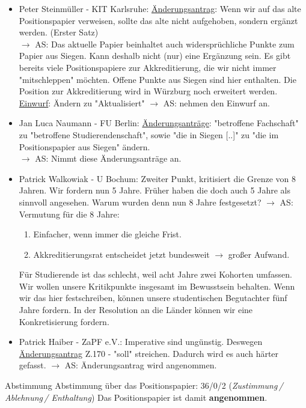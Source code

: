 \begin{itemize}
      \item Peter Steinmüller - KIT Karlsruhe:  \uline{Änderungsantrag}: Wenn wir auf das alte Positionspapier verweisen, sollte das alte nicht aufgehoben, sondern ergänzt werden. (Erster Satz) \\
        $\rightarrow$ AS: Das aktuelle Papier beinhaltet auch widersprüchliche Punkte zum Papier aus Siegen. Kann deshalb nicht (nur) eine Ergänzung sein. Es gibt bereits viele Positionspapiere zur Akkreditierung, die wir nicht immer "mitschleppen" möchten. Offene Punkte aus Siegen sind hier enthalten. Die Position zur Akkreditierung wird in Würzburg noch erweitert werden. \\
        \uline{Einwurf}: Ändern zu "Aktualisiert"
          $\rightarrow$ AS: nehmen den Einwurf an.
      \item Jan Luca Naumann - FU Berlin:  \uline{Änderungsanträge}: "betroffene Fachschaft" zu "betroffene Studierendenschaft", sowie "die in Siegen [..]" zu "die im Positionspapier aus Siegen" ändern. \\
        $\rightarrow$ AS: Nimmt diese Änderungsanträge an.
      \item Patrick Walkowiak - U Bochum: Zweiter Punkt, kritisiert die Grenze von 8 Jahren. Wir fordern nun 5 Jahre. Früher haben die doch auch 5 Jahre als sinnvoll angesehen. Warum wurden denn nun 8 Jahre festgesetzt?
        $\rightarrow$ AS: Vermutung für die 8 Jahre:
        \begin{enumerate}
          \item Einfacher, wenn immer die gleiche Frist.
          \item Akkreditierungsrat entscheidet jetzt bundesweit $\rightarrow$ großer Aufwand.
        \end{enumerate}
        Für Studierende ist das schlecht, weil acht Jahre zwei Kohorten umfassen.
        Wir wollen unsere Kritikpunkte insgesamt im Bewusstsein behalten.
        Wenn wir das hier festschreiben, können unsere studentischen Begutachter fünf Jahre fordern.
        In der Resolution an die Länder können wir eine Konkretisierung fordern.
      \item Patrick Haiber - ZaPF e.V.: Imperative sind ungünstig. Deswegen \uline{Änderungsantrag} Z.170 - "soll" streichen. Dadurch wird es auch härter gefasst.
        $\rightarrow$ AS: Änderungsantrag wird angenommen.
    \end{itemize}

    \begin{success}{Abstimmung}
      Abstimmung über das Positionspapier: 36/0/2 (\textit{Zustimmung\,/ Ablehnung\,/ Enthaltung})
      Das Positionspapier ist damit \textbf{angenommen}.
    \end{success}

